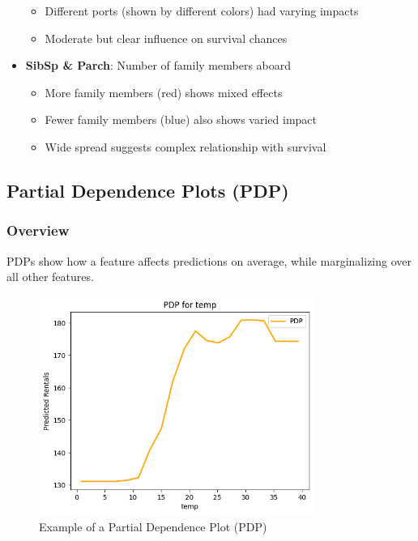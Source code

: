 \documentclass{article}
\begin{document}
\begin{itemize}
        \begin{itemize}
            \item Different ports (shown by different colors) had varying impacts
            \item Moderate but clear influence on survival chances
        \end{itemize}
    \item \textbf{SibSp \& Parch}: Number of family members aboard
        \begin{itemize}
            \item More family members (red) shows mixed effects
            \item Fewer family members (blue) also shows varied impact
            \item Wide spread suggests complex relationship with survival
        \end{itemize}
\end{itemize}

\subsection{Partial Dependence Plots (PDP)}

\subsubsection{Overview}
PDPs show how a feature affects predictions on average, while marginalizing over all other features.

\begin{figure}[h]
    \centering
    \includegraphics[width=0.8\textwidth]{images/pdp.png}
    \caption{Example of a Partial Dependence Plot (PDP)}
    \label{fig:pdp}
\end{figure}
\end{document}
